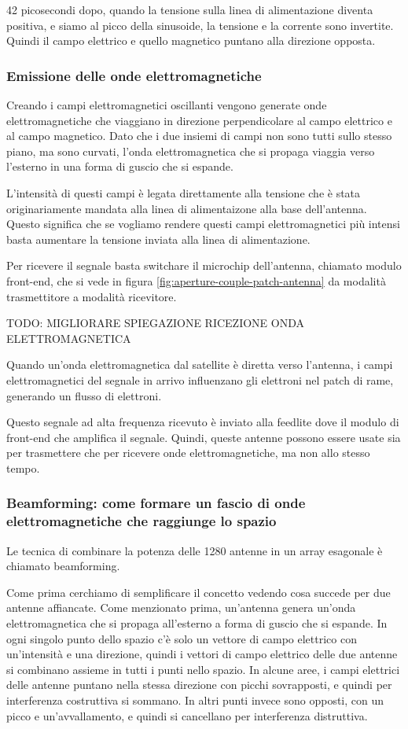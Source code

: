 42 picosecondi dopo, quando la tensione sulla linea di alimentazione diventa positiva, e siamo al picco della sinusoide, la tensione e la corrente sono invertite.
Quindi il campo elettrico e quello magnetico puntano alla direzione opposta.

\subsubsection{Emissione delle onde elettromagnetiche}
Creando i campi elettromagnetici oscillanti vengono generate onde elettromagnetiche che viaggiano in direzione perpendicolare al campo elettrico e al campo magnetico.
Dato che i due insiemi di campi non sono tutti sullo stesso piano, ma sono curvati, l'onda elettromagnetica che si propaga viaggia verso l'esterno in una forma di guscio che si espande.

L'intensità di questi campi è legata direttamente alla tensione che è stata originariamente mandata alla linea di alimentaizone alla base dell'antenna.
Questo significa che se vogliamo rendere questi campi elettromagnetici più intensi basta aumentare la tensione inviata alla linea di alimentazione.

Per ricevere il segnale basta switchare il microchip dell'antenna, chiamato modulo front-end, che si vede in figura \ref{fig:aperture-couple-patch-antenna} da modalità trasmettitore a modalità ricevitore.

TODO: MIGLIORARE SPIEGAZIONE RICEZIONE ONDA ELETTROMAGNETICA

Quando un'onda elettromagnetica dal satellite è diretta verso l'antenna, i campi elettromagnetici del segnale in arrivo influenzano gli elettroni nel patch di rame, generando un flusso di elettroni.

Questo segnale ad alta frequenza ricevuto è inviato alla feedlite dove il modulo di front-end che amplifica il segnale.
Quindi, queste antenne possono essere usate sia per trasmettere che per ricevere onde elettromagnetiche, ma non allo stesso tempo.

\subsubsection{Beamforming: come formare un fascio di onde elettromagnetiche che raggiunge lo spazio}
Le tecnica di combinare la potenza delle 1280 antenne in un array esagonale è chiamato beamforming.

Come prima cerchiamo di semplificare il concetto vedendo cosa succede per due antenne affiancate.
Come menzionato prima, un'antenna genera un'onda elettromagnetica che si propaga all'esterno a forma di guscio che si espande.
In ogni singolo punto dello spazio c'è solo un vettore di campo elettrico con un'intensità e una direzione, quindi i vettori di campo elettrico delle due antenne si combinano assieme in tutti i punti nello spazio.
In alcune aree, i campi elettrici delle antenne puntano nella stessa direzione con picchi sovrapposti, e quindi per interferenza costruttiva si sommano.
In altri punti invece sono opposti, con un picco e un'avvallamento, e quindi si cancellano per interferenza distruttiva.


